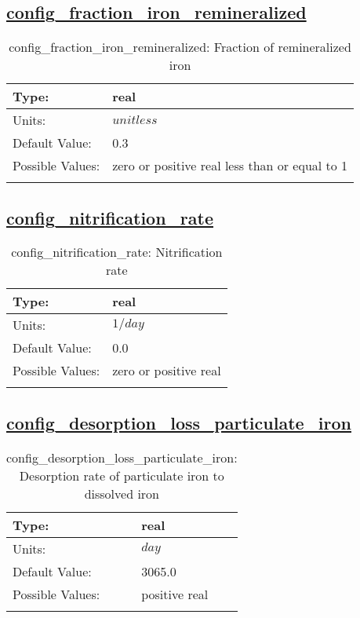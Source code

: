 \subsection[config\_fraction\_iron\_remineralized]{\hyperref[sec:nm_tab_biogeochemistry]{config\_fraction\_iron\_remineralized}}
\label{subsec:nm_sec_config_fraction_iron_remineralized}
\begin{center}
\begin{longtable}{| p{2.0in} || p{4.0in} |}
    \hline
    Type: & real \\
    \hline
    Units: & $unitless$ \\
    \hline
    Default Value: & 0.3 \\
    \hline
    Possible Values: & zero or positive real less than or equal to 1 \\
    \hline
    \caption{config\_fraction\_iron\_remineralized: Fraction of remineralized iron }
\end{longtable}
\end{center}
\subsection[config\_nitrification\_rate]{\hyperref[sec:nm_tab_biogeochemistry]{config\_nitrification\_rate}}
\label{subsec:nm_sec_config_nitrification_rate}
\begin{center}
\begin{longtable}{| p{2.0in} || p{4.0in} |}
    \hline
    Type: & real \\
    \hline
    Units: & $1/day$ \\
    \hline
    Default Value: & 0.0 \\
    \hline
    Possible Values: & zero or positive real \\
    \hline
    \caption{config\_nitrification\_rate: Nitrification rate}
\end{longtable}
\end{center}
\subsection[config\_desorption\_loss\_particulate\_iron]{\hyperref[sec:nm_tab_biogeochemistry]{config\_desorption\_loss\_particulate\_iron}}
\label{subsec:nm_sec_config_desorption_loss_particulate_iron}
\begin{center}
\begin{longtable}{| p{2.0in} || p{4.0in} |}
    \hline
    Type: & real \\
    \hline
    Units: & $day$ \\
    \hline
    Default Value: & 3065.0 \\
    \hline
    Possible Values: & positive real \\
    \hline
    \caption{config\_desorption\_loss\_particulate\_iron: Desorption rate of particulate iron to dissolved iron}
\end{longtable}
\end{center}

